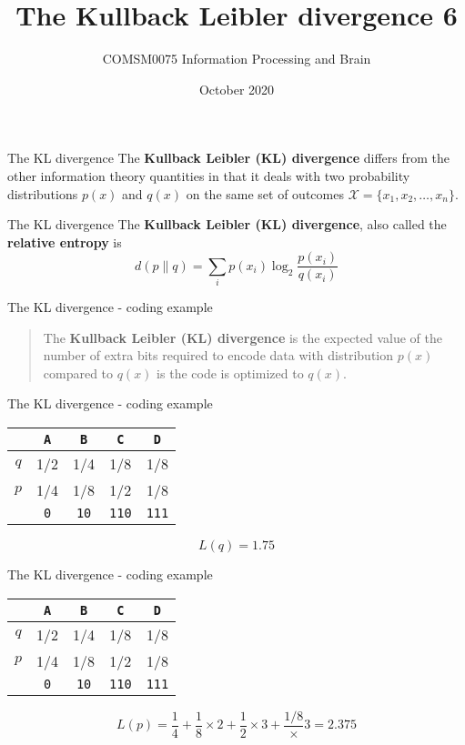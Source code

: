 \documentclass{beamer}
\title[Information Theory task 2]{The Kullback Leibler divergence 6}
\author{COMSM0075 Information Processing and Brain}
\institute{\texttt{comsm0075.github.io}}
\date{October 2020}
\newcommand{\crish}{\color{reddish}}
\newcommand{\cbla}{\color{black}}
\newcommand{\letter}[1]{\color{blue}\texttt{#1}\color{black}}
\newcommand{\binary}[1]{\color{red}\texttt{#1}\color{black}}
\begin{document}
\maketitle

\begin{frame}{The KL divergence}
  The \textbf{Kullback Leibler (KL) divergence} differs from the other
  information theory quantities in that it deals with two probability
  distributions $p(x)$ and $q(x)$ on the same set of outcomes
  \crish$\mathcal{X}=\{x_1,x_2,\ldots,x_n\}$\cbla.
\end{frame}

\begin{frame}{The KL divergence}
  The \textbf{Kullback Leibler (KL) divergence}, also called the \textbf{relative entropy} is
  \crish
  $$
  d(p\|q)=\sum_i p(x_i)\log_2{\frac{p(x_i)}{q(x_i)}}
    $$
    \cbla
\end{frame}


\begin{frame}{The KL divergence - coding example}
\begin{quote}
  The \textbf{Kullback Leibler (KL) divergence} is the expected value
  of the number of extra bits required to encode data with
  distribution $p(x)$ compared to $q(x)$ is the code is optimized to
  $q(x)$.
  \end{quote}
\end{frame}

\begin{frame}{The KL divergence - coding example}

\begin{center}
\begin{tabular}{c|cccc}
&\letter{A}&\letter{B}&\letter{C}&\letter{D}\\
\hline
$q$&1/2&1/4&1/8&1/8\\
$p$&1/4&1/8&1/2&1/8\\
\hline
&\binary{0}&\binary{10}&\binary{110}&\binary{111}
\end{tabular}
\end{center}
\crish
$$
L(q)=1.75
$$
\cbla
\end{frame}


\begin{frame}{The KL divergence - coding example}
\begin{center}
\begin{tabular}{c|cccc}
&\letter{A}&\letter{B}&\letter{C}&\letter{D}\\
\hline
$q$&1/2&1/4&1/8&1/8\\
$p$&1/4&1/8&1/2&1/8\\
\hline
&\binary{0}&\binary{10}&\binary{110}&\binary{111}
\end{tabular}
\end{center}
\crish
$$
L(p)=\frac{1}{4}+\frac{1}{8}\times 2 +\frac{1}{2}\times 3+\frac{1/8}\times 3=2.375
$$
\cbla
\end{frame}
\end{document}
